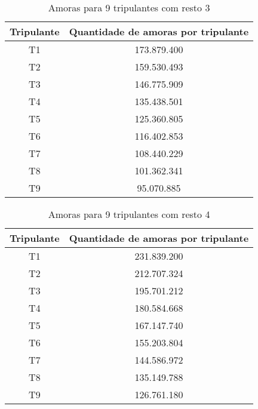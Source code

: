 \documentclass[12pt]{article}
\begin{document}
\begin{table}[H]

\centering

\begin{tabular}{|c|c|}

\hline
Tripulante & Quantidade de amoras por tripulante \\
\hline
T1 & 173.879.400 \\
\hline
T2 & 159.530.493 \\
\hline
T3 & 146.775.909 \\
\hline
T4 & 135.438.501 \\
\hline
T5 & 125.360.805 \\
\hline
T6 & 116.402.853 \\
\hline
T7 & 108.440.229 \\
\hline
T8 & 101.362.341 \\
\hline
T9 & 95.070.885 \\
\hline

\end{tabular}
\label{Tabela13}
\caption{Amoras para 9 tripulantes com resto 3}

\end{table}

\begin{table}[H]

\centering

\begin{tabular}{|c|c|}

\hline
Tripulante & Quantidade de amoras por tripulante \\
\hline
T1 & 231.839.200 \\
\hline
T2 & 212.707.324 \\
\hline
T3 & 195.701.212 \\
\hline
T4 & 180.584.668 \\
\hline
T5 & 167.147.740 \\
\hline
T6 & 155.203.804 \\
\hline
T7 & 144.586.972 \\
\hline
T8 & 135.149.788 \\
\hline
T9 & 126.761.180 \\
\hline

\end{tabular}
\label{Tabela14}
\caption{Amoras para 9 tripulantes com resto 4}

\end{table}
\end{document}
